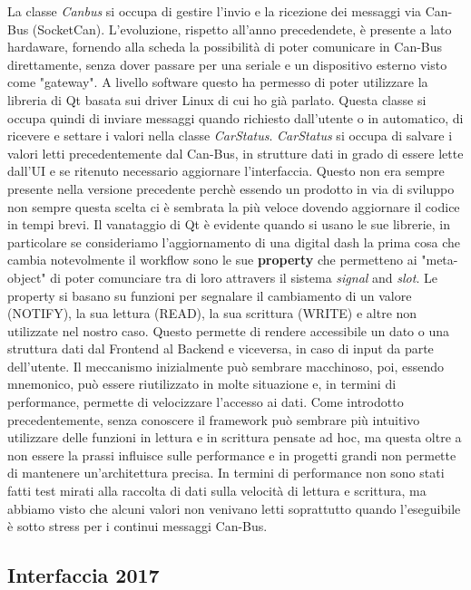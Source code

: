 La classe \emph{Canbus} si occupa di gestire l'invio e la ricezione dei messaggi via Can-Bus (SocketCan).
L'evoluzione, rispetto all'anno precedendete, è presente a lato hardaware, fornendo alla scheda la possibilità
di poter comunicare in Can-Bus direttamente, senza dover passare 
per una seriale e un dispositivo esterno visto come "gateway".
A livello software questo ha permesso di poter utilizzare la libreria 
di Qt basata sui driver Linux di cui ho già parlato.
Questa classe si occupa quindi di inviare messaggi quando richiesto dall'utente o in automatico, 
di ricevere e settare i valori nella classe \emph{CarStatus}.
\emph{CarStatus} si occupa di salvare i valori letti precedentemente dal Can-Bus, 
in strutture dati in grado di essere lette dall'UI 
e se ritenuto necessario aggiornare l'interfaccia. 
Questo non era sempre presente nella versione precedente perchè essendo 
un prodotto in via di sviluppo non sempre questa scelta ci è sembrata la più veloce
dovendo aggiornare il codice in tempi brevi.
Il vanataggio di Qt è evidente quando si usano le sue librerie, 
in particolare se consideriamo l'aggiornamento di una digital dash la prima cosa che 
cambia notevolmente il workflow sono le sue \textbf{property}
che permetteno ai "meta-object" di poter comunciare tra di loro attravers il sistema \emph{signal} and \emph{slot}.
Le property si basano su funzioni per segnalare il cambiamento di un valore (NOTIFY), 
la sua lettura (READ), la sua scrittura (WRITE) e altre non utilizzate nel nostro caso. 
Questo permette di rendere accessibile un dato o una struttura dati dal Frontend al Backend 
e viceversa, in caso di input da parte dell'utente.
Il meccanismo inizialmente può sembrare macchinoso, poi, essendo mnemonico, può essere riutilizzato in molte 
situazione e, in termini di performance, permette di velocizzare l'accesso ai dati. 
Come introdotto precedentemente, senza conoscere il framework può sembrare più intuitivo utilizzare delle funzioni
in lettura e in scrittura pensate ad hoc, ma questa oltre a non essere la prassi influisce
sulle performance e in progetti grandi non permette di mantenere un'architettura precisa.
In termini di performance non sono stati fatti test mirati alla raccolta di dati sulla velocità di lettura e scrittura, 
ma abbiamo visto che alcuni valori non venivano letti soprattutto 
quando l'eseguibile è sotto stress per i continui messaggi Can-Bus.

\subsection{Interfaccia 2017}

